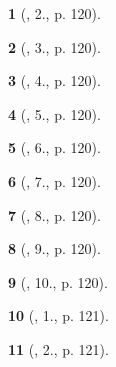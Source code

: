 \documentclass{article}
\newtheorem{baitoan}{}
\begin{document}
\begin{baitoan}[\cite{SGK_Toan_11_hinh_hoc_co_ban}, 2., p. 120]
	
\end{baitoan}

\begin{baitoan}[\cite{SGK_Toan_11_hinh_hoc_co_ban}, 3., p. 120]
	
\end{baitoan}

\begin{baitoan}[\cite{SGK_Toan_11_hinh_hoc_co_ban}, 4., p. 120]
	
\end{baitoan}

\begin{baitoan}[\cite{SGK_Toan_11_hinh_hoc_co_ban}, 5., p. 120]
	
\end{baitoan}

\begin{baitoan}[\cite{SGK_Toan_11_hinh_hoc_co_ban}, 6., p. 120]
	
\end{baitoan}

\begin{baitoan}[\cite{SGK_Toan_11_hinh_hoc_co_ban}, 7., p. 120]
	
\end{baitoan}

\begin{baitoan}[\cite{SGK_Toan_11_hinh_hoc_co_ban}, 8., p. 120]
	
\end{baitoan}

\begin{baitoan}[\cite{SGK_Toan_11_hinh_hoc_co_ban}, 9., p. 120]
	
\end{baitoan}

\begin{baitoan}[\cite{SGK_Toan_11_hinh_hoc_co_ban}, 10., p. 120]
	
\end{baitoan}

\begin{baitoan}[\cite{SGK_Toan_11_hinh_hoc_co_ban}, 1., p. 121]
	
\end{baitoan}

\begin{baitoan}[\cite{SGK_Toan_11_hinh_hoc_co_ban}, 2., p. 121]
	
\end{baitoan}
\end{document}
